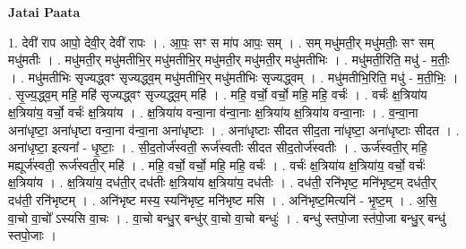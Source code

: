 \documentclass[17pt]{extarticle}
\begin{document}
\textbf{Jatai Paata} \newline

1. देवी॑ राप आपो॒ देवी॒र् देवी॑ रापः । . आ॒पः॒ सꣳ स मा॑प आपः॒ सम् । . सम् मधु॑मती॒र् मधु॑मतीः॒ सꣳ सम् मधु॑मतीः । . मधु॑मती॒र् मधु॑मतीभि॒र् मधु॑मतीभि॒र् मधु॑मती॒र् मधु॑मती॒र् मधु॑मतीभिः । . मधु॑मती॒रिति॒ मधु॑ - म॒तीः॒ । . मधु॑मतीभिः सृज्यद्ध्वꣳ सृज्यद्ध्व॒म् मधु॑मतीभि॒र् मधु॑मतीभिः सृज्यद्ध्वम् । . मधु॑मतीभि॒रिति॒ मधु॑ - म॒ती॒भिः॒ । . सृ॒ज्य॒द्ध्व॒म् महि॒ महि॑ सृज्यद्ध्वꣳ सृज्यद्ध्व॒म् महि॑ । . महि॒ वर्चो॒ वर्चो॒ महि॒ महि॒ वर्चः॑ । . वर्चः॑ क्ष॒त्रिया॑य क्ष॒त्रिया॑य॒ वर्चो॒ वर्चः॑ क्ष॒त्रिया॑य । . क्ष॒त्रिया॑य वन्वा॒ना व॑न्वा॒नाः क्ष॒त्रिया॑य क्ष॒त्रिया॑य वन्वा॒नाः । . व॒न्वा॒ना अना॑धृष्टा॒ अना॑धृष्टा वन्वा॒ना व॑न्वा॒ना अना॑धृष्टाः । . अना॑धृष्टाः सीदत सीद॒ता ना॑धृष्टा॒ अना॑धृष्टाः सीदत । . अना॑धृष्टा॒ इत्यना᳚ - धृ॒ष्टाः॒ । . सी॒द॒तोर्ज॑स्वती॒ रूर्ज॑स्वतीः सीदत सीद॒तोर्ज॑स्वतीः । . ऊर्ज॑स्वती॒र् महि॒ मह्यूर्ज॑स्वती॒ रूर्ज॑स्वती॒र् महि॑ । . महि॒ वर्चो॒ वर्चो॒ महि॒ महि॒ वर्चः॑ । . वर्चः॑ क्ष॒त्रिया॑य क्ष॒त्रिया॑य॒ वर्चो॒ वर्चः॑ क्ष॒त्रिया॑य । . क्ष॒त्रिया॑य॒ दध॑ती॒र् दध॑तीः क्ष॒त्रिया॑य क्ष॒त्रिया॑य॒ दध॑तीः । . दध॑ती॒ रनि॑भृष्ट॒ मनि॑भृष्ट॒म् दध॑ती॒र् दध॑ती॒ रनि॑भृष्टम् । . अनि॑भृष्ट मस्य॒ स्यनि॑भृष्ट॒ मनि॑भृष्ट मसि । . अनि॑भृष्ट॒मित्यनि॑ - भृ॒ष्ट॒म् । . अ॒सि॒ वा॒चो वा॒चो᳚ ऽस्यसि वा॒चः । . वा॒चो बन्धु॒र् बन्धु॑र् वा॒चो वा॒चो बन्धुः॑ । . बन्धु॑ स्तपो॒जा स्त॑पो॒जा बन्धु॒र् बन्धु॑ स्तपो॒जाः । \newline
\end{document}
